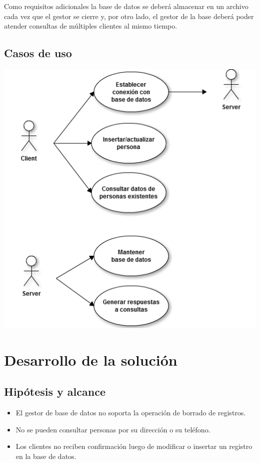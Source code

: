 \documentclass[a4paper,10pt]{article}
\begin{document}
Como requisitos adicionales la base de datos se deberá almacenar en un archivo cada vez que el gestor se cierre y, por otro lado, el gestor de la base deberá poder atender consultas de múltiples clientes al mismo tiempo.

\subsection{Casos de uso}

	\begin{center}
        \includegraphics[scale=0.8]{casos_de_uso.png}
    \end{center}
    
\clearpage
\section{Desarrollo de la solución}

\subsection{Hipótesis y alcance}

\begin{itemize}
\item El gestor de base de datos no soporta la operación de borrado de registros.
\item No se pueden consultar personas por su dirección o su teléfono.
\item Los clientes no reciben confirmación luego de modificar o insertar un registro en la base de datos.
\end{itemize}
\end{document}
